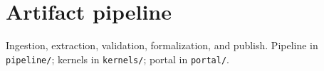 \section{Artifact pipeline}

Ingestion, extraction, validation, formalization, and publish.
Pipeline in \texttt{pipeline/}; kernels in \texttt{kernels/}; portal in \texttt{portal/}.
